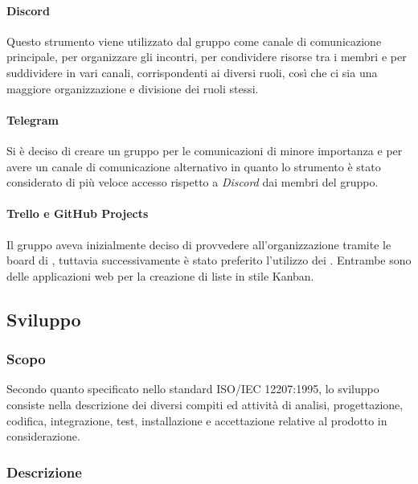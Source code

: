 \paragraph{Discord}

Questo strumento viene utilizzato dal gruppo come canale di comunicazione principale, per organizzare gli incontri, per 
condividere risorse tra i membri e per suddividere in vari canali, corrispondenti ai diversi ruoli, così che ci sia una 
maggiore organizzazione e divisione dei ruoli stessi.

\paragraph{Telegram}

Si è deciso di creare un gruppo  per le comunicazioni di minore importanza e per avere un canale di 
comunicazione alternativo in quanto lo strumento è stato considerato di più veloce accesso rispetto a \emph{Discord} 
dai membri del gruppo.

\paragraph{Trello e GitHub Projects}

Il gruppo aveva inizialmente deciso di provvedere all'organizzazione tramite le board di , tuttavia 
successivamente è stato preferito l'utilizzo dei . Entrambe sono delle applicazioni web per 
la creazione di liste in stile Kanban.

\subsection{Sviluppo}

\subsubsection{Scopo}

Secondo quanto specificato nello standard \textsc{ISO/IEC  12207:1995}, lo sviluppo consiste nella descrizione dei 
diversi compiti ed attività di analisi, progettazione, codifica, integrazione, test, installazione e accettazione 
relative al prodotto in considerazione.

\subsubsection{Descrizione}

